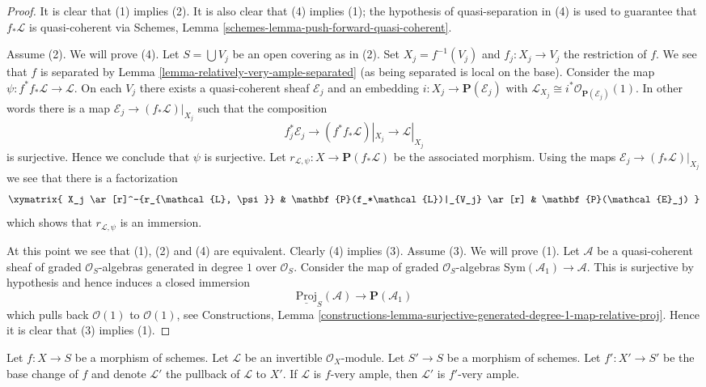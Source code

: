 \begin{proof}
It is clear that (1) implies (2). It is also clear that
(4) implies (1); the hypothesis of quasi-separation
in (4) is used to guarantee that $f_*\mathcal{L}$ is quasi-coherent via
Schemes, Lemma \ref{schemes-lemma-push-forward-quasi-coherent}.

\medskip\noindent
Assume (2).
We will prove (4).
Let $S = \bigcup V_j$ be an open covering as in (2).
Set $X_j = f^{-1}(V_j)$ and $f_j : X_j \to V_j$ the
restriction of $f$. We see that $f$ is separated by
Lemma \ref{lemma-relatively-very-ample-separated} (as being
separated is local on the base). Consider the map
$\psi : f^*f_*\mathcal{L} \to \mathcal{L}$. On each $V_j$ there exists a
quasi-coherent sheaf $\mathcal{E}_j$ and an embedding
$i : X_j \to \mathbf{P}(\mathcal{E}_j)$ with
$\mathcal{L}_{X_j} \cong i^*\mathcal{O}_{\mathbf{P}(\mathcal{E}_j)}(1)$.
In other words there is a map $\mathcal{E}_j \to (f_*\mathcal{L})|_{X_j}$
such that the composition
$$
f_j^*\mathcal{E}_j \to (f^*f_*\mathcal{L})|_{X_j} \to \mathcal{L}|_{X_j}
$$
is surjective. Hence we conclude that $\psi$ is surjective. Let
$r_{\mathcal{L}, \psi} : X \to \mathbf{P}(f_*\mathcal{L})$ be the
associated morphism.
Using the maps $\mathcal{E}_j \to (f_*\mathcal{L})|_{X_j}$
we see that there is a factorization
$$
\xymatrix{
X_j \ar[r]^-{r_{\mathcal{L}, \psi}} &
\mathbf{P}(f_*\mathcal{L})|_{V_j} \ar[r] &
\mathbf{P}(\mathcal{E}_j)
}
$$
which shows that $r_{\mathcal{L}, \psi}$ is an immersion.

\medskip\noindent
At this point we see that (1), (2) and (4) are equivalent.
Clearly (4) implies (3). Assume (3). We will prove (1).
Let $\mathcal{A}$ be a quasi-coherent sheaf of graded $\mathcal{O}_S$-algebras
generated in degree $1$ over $\mathcal{O}_S$. Consider the map of
graded $\mathcal{O}_S$-algebras $\text{Sym}(\mathcal{A}_1) \to \mathcal{A}$.
This is surjective by hypothesis and hence induces a closed immersion
$$
\underline{\text{Proj}}_S(\mathcal{A})
\longrightarrow
\mathbf{P}(\mathcal{A}_1)
$$
which pulls back $\mathcal{O}(1)$ to $\mathcal{O}(1)$,
see Constructions, Lemma
\ref{constructions-lemma-surjective-generated-degree-1-map-relative-proj}.
Hence it is clear that (3) implies (1).
\end{proof}

\begin{lemma}
\label{lemma-very-ample-base-change}
Let $f : X \to S$ be a morphism of schemes.
Let $\mathcal{L}$ be an invertible $\mathcal{O}_X$-module.
Let $S' \to S$ be a morphism of schemes.
Let $f' : X' \to S'$ be the base change of $f$ and denote
$\mathcal{L}'$ the pullback of $\mathcal{L}$ to $X'$.
If $\mathcal{L}$ is $f$-very ample, then $\mathcal{L}'$ is $f'$-very ample.
\end{lemma}

